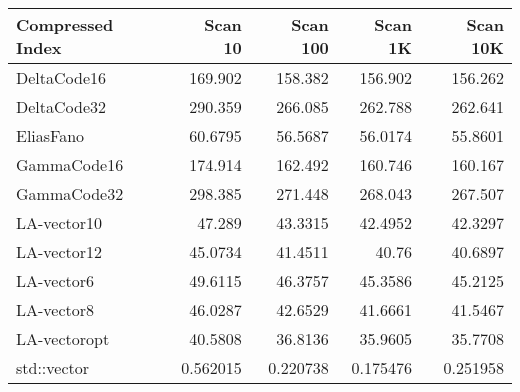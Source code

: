 \begin{tabular}{lrrrr}
\hline
 Compressed Index   &    Scan 10 &   Scan 100 &    Scan 1K &   Scan 10K \\
\hline
 DeltaCode16        & 169.902    & 158.382    & 156.902    & 156.262    \\
 DeltaCode32        & 290.359    & 266.085    & 262.788    & 262.641    \\
 EliasFano          &  60.6795   &  56.5687   &  56.0174   &  55.8601   \\
 GammaCode16        & 174.914    & 162.492    & 160.746    & 160.167    \\
 GammaCode32        & 298.385    & 271.448    & 268.043    & 267.507    \\
 LA-vector10        &  47.289    &  43.3315   &  42.4952   &  42.3297   \\
 LA-vector12        &  45.0734   &  41.4511   &  40.76     &  40.6897   \\
 LA-vector6         &  49.6115   &  46.3757   &  45.3586   &  45.2125   \\
 LA-vector8         &  46.0287   &  42.6529   &  41.6661   &  41.5467   \\
 LA-vectoropt       &  40.5808   &  36.8136   &  35.9605   &  35.7708   \\
 std::vector        &   0.562015 &   0.220738 &   0.175476 &   0.251958 \\
\hline
\end{tabular}